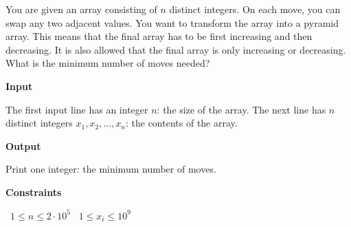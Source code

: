 You are given an array consisting of $n$ distinct integers. On each move, you can swap any two adjacent values.
You want to transform the array into a pyramid array. This means that the final array has to be first increasing and then decreasing. It is also allowed that the final array is only increasing or decreasing.
What is the minimum number of moves needed?

\vspace{0.3cm}\noindent\textbf{Input}

The first input line has an integer $n$: the size of the array.
The next line has $n$ distinct integers $x_1,x_2,\dots,x_n$: the contents of the array.

\vspace{0.3cm}\noindent\textbf{Output}

Print one integer: the minimum number of moves.

\vspace{0.3cm}\noindent\textbf{Constraints}

\textbullet\ $1 \le n \le 2 \cdot 10^5$
\textbullet\ $1 \le x_i \le 10^9$